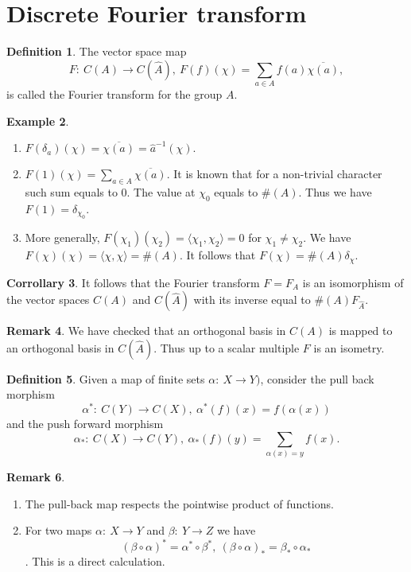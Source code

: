 \documentclass[11pt]{amsart}
\theoremstyle{definition}
\newtheorem{defi}{Definition}[section]
\newtheorem{eg}[defi]{Example}
\newtheorem{rem}[defi]{Remark}
\newtheorem{cor}[defi]{Corrollary}
\begin{document}
\section{Discrete Fourier transform}
\begin{defi}
    The vector space map $$F:\ C(A)\to C(\hat{A}), \ F(f)(\chi)=\sum_{a\in A}f(a)\overline{\chi(a)},$$ is called the Fourier transform for the group $A$.
\end{defi}
\begin{eg}
\begin{enumerate} Let us calculate some examples:
\item
$F(\delta_a)(\chi)=\overline{\chi(a)}=\hat{a}^{-1}(\chi).$ 
\item 
$F(1)(\chi)=\sum_{a\in A}\overline{\chi(a)}$. It is known that for a non-trivial character such sum equals to $0$. The value at $\chi_0$ equals to $\#(A)$. Thus we have $F(1)=\delta_{\chi_0}$.
\item 
More generally, $F(\chi_1)(\chi_2)=\langle\chi_1,\chi_2\rangle=0$ for $\chi_1\ne\chi_2$. We have $F(\chi)(\chi)=\langle\chi,\chi\rangle=\#(A)$. It follows that $F(\chi)=\#(A)\delta_\chi$.
\end{enumerate}
\end{eg}
\begin{cor}
    It follows that the Fourier transform $F=F_A$ is an isomorphism of the vector spaces $C(A)$ and $C(\hat{A})$ with its inverse equal to $\#(A)F_{\hat{A}}$.
\end{cor}
\begin{rem}
    We have checked that an orthogonal basis in $C(A)$ is mapped to an orthogonal basis in $C(\hat{A})$. Thus up to a scalar multiple $F$ is an isometry. 
\end{rem}
\begin{defi} Given a map of finite sets $\alpha:\ X\to Y)$, consider the pull back morphism 
$$\alpha^*:\ C(Y)\to C(X),\ \alpha^*(f)(x)=f(\alpha(x))$$
and the push forward morphism
$$\alpha_*:\ C(X)\to C(Y),\ \alpha_*(f)(y)=\sum_{\alpha(x)=y}f(x).$$
\end{defi}
\begin{rem}
    \begin{enumerate}
    \item The pull-back map respects the pointwise product of functions.
    \item For two maps $\alpha:\ X\to Y$ and $\beta:\ Y\to Z$ we have 
    $$(\beta\circ\alpha)^*=\alpha^*\circ\beta^*,\ (\beta\circ\alpha)_*=\beta_*\circ\alpha_*$$. This is a direct calculation. 
        \end{enumerate}
\end{rem}
\end{document}
